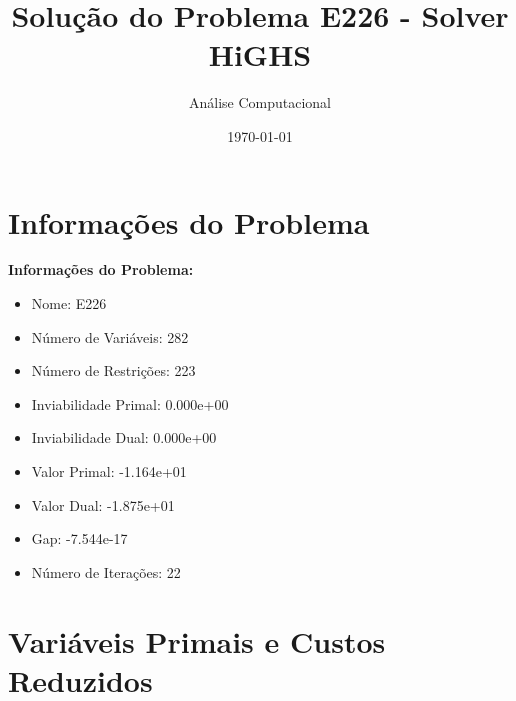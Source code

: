 \documentclass[12pt]{article}
\title{Solução do Problema E226 - Solver HiGHS}
\author{Análise Computacional}
\date{\today}
\begin{document}
\maketitle

\section{Informações do Problema}

\textbf{Informações do Problema:}
\begin{itemize}
\item Nome: E226
\item Número de Variáveis: 282
\item Número de Restrições: 223
\item Inviabilidade Primal: 0.000e+00
\item Inviabilidade Dual: 0.000e+00
\item Valor Primal: -1.164e+01
\item Valor Dual: -1.875e+01
\item Gap: -7.544e-17
\item Número de Iterações: 22
\end{itemize}


\section{Variáveis Primais e Custos Reduzidos}
\end{document}
